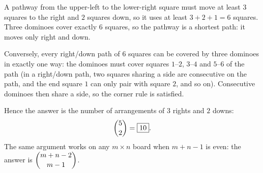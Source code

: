 A pathway from the upper-left to the lower-right square must move at least $3$ squares to the right and $2$ squares down, so it uses at least $3+2+1=6$ squares. Three dominoes cover exactly $6$ squares, so the pathway is a shortest path: it moves only right and down.

Conversely, every right/down path of $6$ squares can be covered by three dominoes in exactly one way: the dominoes must cover squares $1$--$2$, $3$--$4$ and $5$--$6$ of the path (in a right/down path, two squares sharing a side are consecutive on the path, and the end square $1$ can only pair with square $2$, and so on). Consecutive dominoes then share a side, so the corner rule is satisfied.

Hence the answer is the number of arrangements of $3$ rights and $2$ downs:
\[\dbinom{5}{2}=\boxed{10}.\]
The same argument works on any $m\times n$ board when $m+n-1$ is even: the answer is $\dbinom{m+n-2}{m-1}$.
